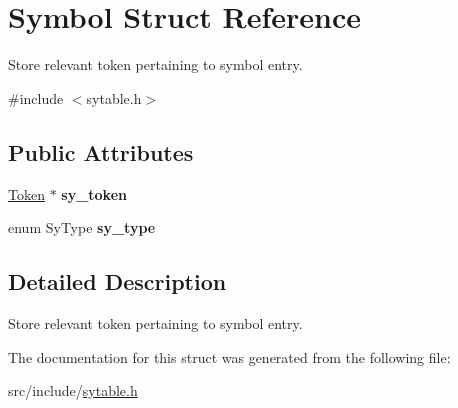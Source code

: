 \hypertarget{struct_symbol}{}\section{Symbol Struct Reference}
\label{struct_symbol}


Store relevant token pertaining to symbol entry.  




{\ttfamily \#include $<$sytable.\+h$>$}

\subsection*{Public Attributes}
\begin{DoxyCompactItemize}
\item 
\mbox{\label{struct_symbol_a978e6b2eaf61ecb95479ac8ac3abc043}} 
\mbox{\hyperlink{struct_token}{Token}} $\ast$ {\bfseries sy\+\_\+token}
\item 
\mbox{\label{struct_symbol_a58043e30d9c9764c82d7762b2d7d1fe6}} 
enum Sy\+Type {\bfseries sy\+\_\+type}
\end{DoxyCompactItemize}


\subsection{Detailed Description}
Store relevant token pertaining to symbol entry. 

The documentation for this struct was generated from the following file\+:\begin{DoxyCompactItemize}
\item 
src/include/\mbox{\hyperlink{sytable_8h}{sytable.\+h}}\end{DoxyCompactItemize}
